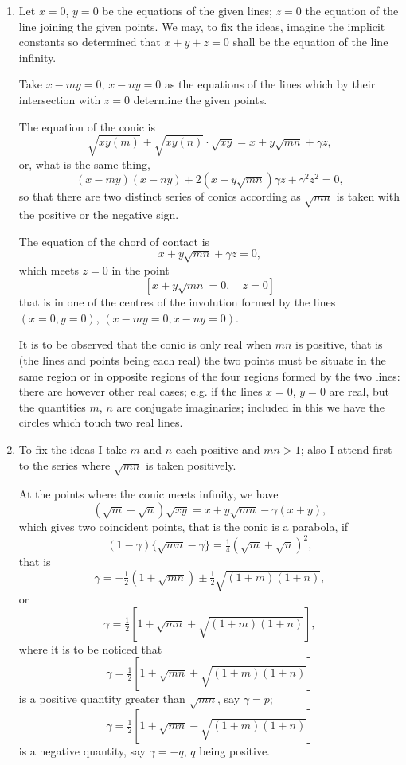 \documentclass[12pt,a4paper]{article}
\theoremstyle{plain}
\theoremstyle{definition}
\theoremstyle{remark}
\begin{document}
\begin{enumerate}[label=\arabic*.]
\item Let $x = 0$, $y = 0$ be the equations of the given lines; $z = 0$ the equation of the line joining the given points. We may, to fix the ideas, imagine the implicit constants so determined that $x + y + z = 0$ shall be the equation of the line infinity.

Take $x - my = 0$, $x - ny = 0$ as the equations of the lines which by their intersection with $z = 0$ determine the given points.

The equation of the conic is
\[\sqrt{xy(m)} + \sqrt{xy(n)} \cdot \sqrt{xy} = x + y\sqrt{mn} + \gamma z,\]
or, what is the same thing,
\[(x - my)(x - ny) + 2(x + y\sqrt{mn})\gamma z + \gamma^2 z^2 = 0,\]
so that there are two distinct series of conics according as $\sqrt{mn}$ is taken with the positive or the negative sign.

The equation of the chord of contact is
\[x + y\sqrt{mn} + \gamma z = 0,\]
which meets $z = 0$ in the point
\[[x + y\sqrt{mn} = 0, \quad z = 0]\]
that is in one of the centres of the involution formed by the lines $(x = 0, y = 0)$, $(x - my = 0, x - ny = 0)$.

It is to be observed that the conic is only real when $mn$ is positive, that is (the lines and points being each real) the two points must be situate in the same region or in opposite regions of the four regions formed by the two lines: there are however other real cases; e.g. if the lines $x = 0$, $y = 0$ are real, but the quantities $m$, $n$ are conjugate imaginaries; included in this we have the circles which touch two real lines.

\item To fix the ideas I take $m$ and $n$ each positive and $mn > 1$; also I attend first to the series where $\sqrt{mn}$ is taken positively.

At the points where the conic meets infinity, we have
\[(\sqrt{m} + \sqrt{n})\sqrt{xy} = x + y\sqrt{mn} - \gamma(x + y),\]
which gives two coincident points, that is the conic is a parabola, if
\[(1 - \gamma)\{\sqrt{mn} - \gamma\} = \tfrac{1}{4}(\sqrt{m} + \sqrt{n})^2,\]
that is
\[\gamma = -\tfrac{1}{2}(1 + \sqrt{mn}) \pm \tfrac{1}{2}\sqrt{(1 + m)(1 + n)},\]
or
\[\gamma = \tfrac{1}{2}[1 + \sqrt{mn} + \sqrt{(1 + m)(1 + n)}],\]
where it is to be noticed that
\[\gamma = \tfrac{1}{2}[1 + \sqrt{mn} + \sqrt{(1 + m)(1 + n)}]\]
is a positive quantity greater than $\sqrt{mn}$, say $\gamma = p$;
\[\gamma = \tfrac{1}{2}[1 + \sqrt{mn} - \sqrt{(1 + m)(1 + n)}]\]
is a negative quantity, say $\gamma = -q$, $q$ being positive.


\end{enumerate}
\end{document}

